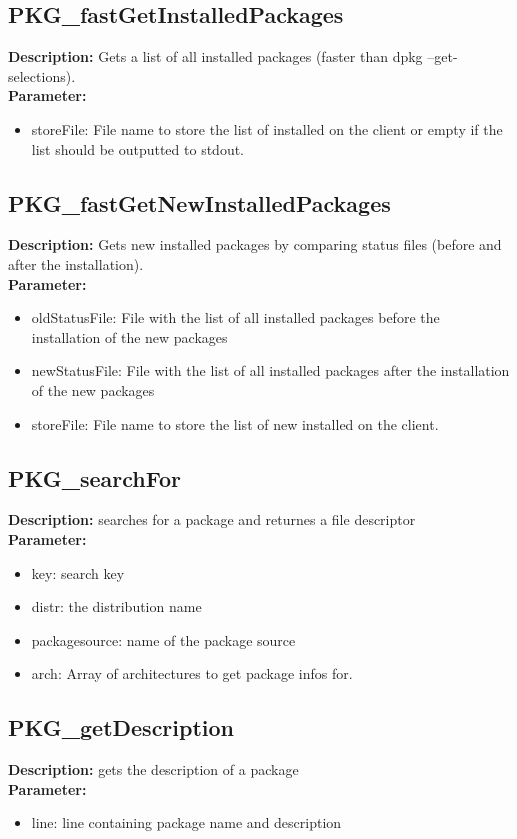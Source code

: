 \subsection{PKG\_fastGetInstalledPackages}
\textbf{Description:} Gets a list of all installed packages (faster than dpkg --get-selections).\\
\textbf{Parameter:}
\begin{itemize}
\item storeFile: File name to store the list of installed on the client or empty if the list should be outputted to stdout.
\end{itemize}

\subsection{PKG\_fastGetNewInstalledPackages}
\textbf{Description:} Gets new installed packages by comparing status files (before and after the installation).\\
\textbf{Parameter:}
\begin{itemize}
\item oldStatusFile: File with the list of all installed packages before the installation of the new packages
\item newStatusFile: File with the list of all installed packages after the installation of the new packages
\item storeFile: File name to store the list of new installed on the client.
\end{itemize}

\subsection{PKG\_searchFor}
\textbf{Description:} searches for a package and returnes a file descriptor\\
\textbf{Parameter:}
\begin{itemize}
\item key: search key
\item distr: the distribution name
\item packagesource: name of the package source
\item arch: Array of architectures to get package infos for.
\end{itemize}

\subsection{PKG\_getDescription}
\textbf{Description:} gets the description of a package\\
\textbf{Parameter:}
\begin{itemize}
\item line: line containing package name and description
\end{itemize}

